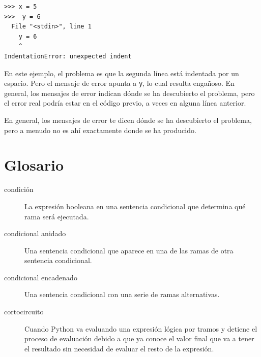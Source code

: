 
\begin{Verbatim}[frame=single]
>>> x = 5
>>>  y = 6
  File "<stdin>", line 1
    y = 6
    ^
IndentationError: unexpected indent
\end{Verbatim}

En este ejemplo, el problema es que la segunda línea está indentada por
un espacio. Pero el mensaje de error apunta a \texttt{y}, lo cual
resulta engañoso. En general, los mensajes de error indican dónde se ha
descubierto el problema, pero el error real podría estar en el código
previo, a veces en alguna línea anterior.

En general, los mensajes de error te dicen dónde se ha descubierto el
problema, pero a menudo no es ahí exactamente donde se ha producido.

\hypertarget{glosario}{%
\section{Glosario}\label{glosario}}

\begin{description}
\item[condición]
La expresión booleana en una sentencia condicional que determina qué
rama será ejecutada.
\end{description}


\begin{description}
\item[condicional anidado]
Una sentencia condicional que aparece en una de las ramas de otra
sentencia condicional.
\end{description}

 

\begin{description}
\item[condicional encadenado]
Una sentencia condicional con una serie de ramas alternativas.
\end{description}

 

\begin{description}
\item[cortocircuito]
Cuando Python va evaluando una expresión lógica por tramos y detiene el
proceso de evaluación debido a que ya conoce el valor final que va a
tener el resultado sin necesidad de evaluar el resto de la expresión.
\end{description}

